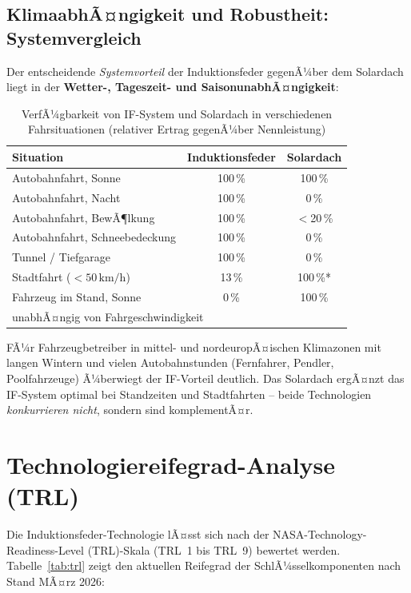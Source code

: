 ﻿\documentclass[12pt, a4paper]{report}
\theoremstyle{definition}
\theoremstyle{remark}
\begin{document}
\subsection{KlimaabhÃ¤ngigkeit und Robustheit: Systemvergleich}

Der entscheidende \emph{Systemvorteil} der Induktionsfeder gegenÃ¼ber dem
Solardach liegt in der \textbf{Wetter-, Tageszeit- und SaisonunabhÃ¤ngigkeit}:

\begin{table}[H]
  \centering
  \caption{VerfÃ¼gbarkeit von IF-System und Solardach in verschiedenen
           Fahrsituationen (relativer Ertrag gegenÃ¼ber Nennleistung)}
  \label{tab:verfuegbarkeit}
  \begin{tabular}{lcc}
    \toprule
    Situation & Induktionsfeder & Solardach \\
    \midrule
    Autobahnfahrt, Sonne          & 100\,\%        & 100\,\% \\
    Autobahnfahrt, Nacht          & 100\,\%        & 0\,\% \\
    Autobahnfahrt, BewÃ¶lkung      & 100\,\%        & $<$20\,\% \\
    Autobahnfahrt, Schneebedeckung& 100\,\%        & 0\,\% \\
    Tunnel / Tiefgarage           & 100\,\%        & 0\,\% \\
    Stadtfahrt ($< 50\,\text{km/h}$) & 13\,\%     & 100\,\%* \\
    Fahrzeug im Stand, Sonne      & 0\,\%          & 100\,\% \\
    \bottomrule
    \multicolumn{3}{l}{\footnotesize *unabhÃ¤ngig von Fahrgeschwindigkeit}
  \end{tabular}
\end{table}

FÃ¼r Fahrzeugbetreiber in mittel- und nordeuropÃ¤ischen Klimazonen mit langen
Wintern und vielen Autobahnstunden (Fernfahrer, Pendler, Poolfahrzeuge)
Ã¼berwiegt der IF-Vorteil deutlich. Das Solardach ergÃ¤nzt das IF-System
optimal bei Standzeiten und Stadtfahrten -- beide Technologien
\emph{konkurrieren nicht}, sondern sind komplementÃ¤r.

\section{Technologiereifegrad-Analyse (TRL)}
\label{sec:trl}

Die Induktionsfeder-Technologie lÃ¤sst sich nach der NASA-Technology-Readiness-Level
(TRL)-Skala (TRL~1 bis TRL~9) bewertet werden. Tabelle~\ref{tab:trl} zeigt
den aktuellen Reifegrad der SchlÃ¼sselkomponenten nach Stand MÃ¤rz 2026:
\end{document}
